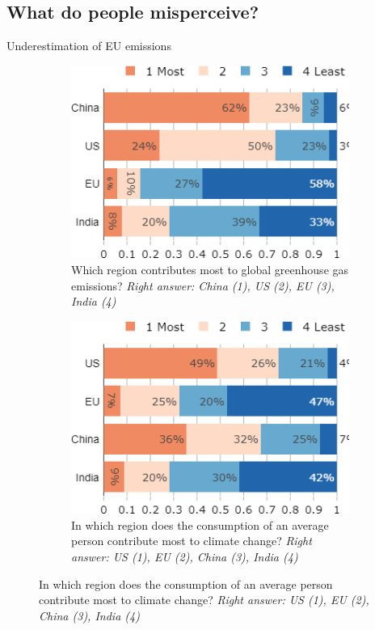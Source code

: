 \begin{framefont}{\small}
\subsection{What do people misperceive?}
\begin{frame}{Underestimation of EU emissions}%
	\begin{figure}[h!]
	\centering
	\begin{subfigure}[b]{0.425\paperwidth}
	\centering
	\caption{Which region contributes most to global greenhouse gas emissions?
	\newline \footnotesize{\textit{Right answer: China (1), US (2), EU (3), India (4)}}} %
	\includegraphics[width=.425\paperwidth]{../figures/FR/footprint_region_no_miss_FR.png}
	\end{subfigure}
	\hfill
	\begin{subfigure}[b]{0.425\paperwidth}
	\centering
	\caption{In which region does the consumption of an average person contribute most to climate change?
	\newline \footnotesize{\textit{Right answer: US (1), EU (2), China (3), India (4)}}} %
	\includegraphics[width=.425\paperwidth]{../figures/FR/footprint_pc_no_miss_FR.png}
	\end{subfigure}
	\end{figure}
\end{frame}


\end{framefont}
